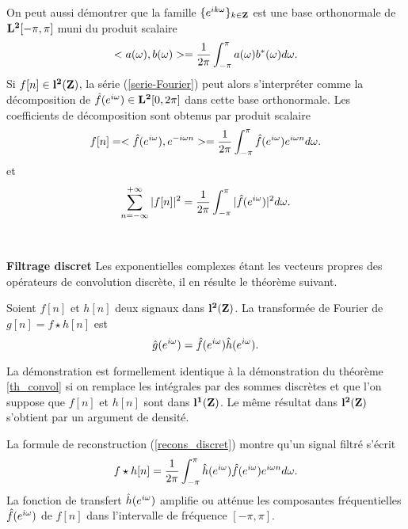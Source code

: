 On peut aussi d\'emontrer \cite{bony} que
la famille $\{{e ^{i k\omega}}\}_{ k \in {{\bf{Z}}}}$ est une
base orthonormale de ${\bf L ^2 }[-\pi, \pi]$ muni du produit scalaire
\[
<a({\omega}),b({\omega})> =
\frac 1 {2 \pi}
\int_{- \pi}^{\pi} a( {\omega} ) b^* ({\omega}) d {\omega} .
\]
Si $f[n] \in {\bf l ^ 2 ({\bf{Z}})}$,
la s\'erie (\ref{serie-Fourier}) peut
alors s'interpr\'eter
comme la d\'ecomposition de $\hat f ({e ^{i \omega}}) \in {\bf L ^2 }[0,2\pi]$
dans cette base orthonormale.
Les coefficients de d\'ecomposition
sont obtenus par produit scalaire
\begin{equation}
\label{recons_discret}
f[n] = <\hat f({e ^{i \omega}}),e ^{-i {\omega} n}  > = \frac 1 {2 \pi}
\int_{- \pi}^{\pi} \hat f(e^{i {\omega} }) e ^{i {\omega} n} d {\omega} .
\end{equation}
et
\begin{equation}
\sum_{n=-\infty}^{+\infty} |f[n]|^2 =
\frac 1 {2 \pi}
\int_{- \pi}^{\pi} |\hat f(e^{i {\omega} })|^2 d {\omega} .
\end{equation}
\\
\\
{\bf Filtrage discret}
Les exponentielles complexes \'etant les vecteurs propres des
op\'erateurs de convolution discr\`ete, il en r\'esulte
le th\'eor\`eme suivant.

\begin{theorem} 
Soient $f[n]$ et $h[n]$ deux signaux dans ${\bf l ^ 2 ({\bf{Z}})}$.
La transform\'ee de Fourier de $g[n] = f \star h [n]$ est
\begin{equation}
\hat g(e^{i {\omega}}) = \hat f(e^{i {\omega}}) \hat h(e^{i {\omega}}) .
\end{equation}
\end{theorem}

La d\'emonstration est
formellement identique \`a la d\'emonstration du th\'eor\`eme
\ref{th_convol} si on
remplace les int\'egrales par des sommes discr\`etes
et que l'on suppose que $f[n]$ et $h[n]$ sont dans ${\bf l ^ 1 ({\bf{Z}})}$.
Le m\^eme r\'esultat dans ${\bf l ^ 2 ({\bf{Z}})}$ s'obtient par un argument de
densit\'e.

La formule de reconstruction (\ref{recons_discret})
montre qu'un signal filtr\'e s'\'ecrit
\begin{equation}
f \star h[n] = \frac 1 {2 \pi}
\int_{- \pi}^{\pi} \hat h({e ^{i \omega}}) \hat f(e^{i {\omega} }) e ^{i {\omega} n} d {\omega} .
\end{equation}
La fonction de transfert $\hat h({e ^{i \omega}})$ amplifie ou att\'enue
les composantes fr\'equentielles $\hat f({e ^{i \omega}})$ de $f[n]$
dans l'intervalle de fr\'equence $[-\pi,\pi]$.

